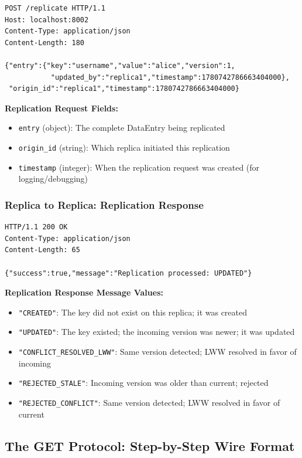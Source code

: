 \documentclass[10pt,a4paper]{article}
\begin{document}
\begin{verbatim}
POST /replicate HTTP/1.1
Host: localhost:8002
Content-Type: application/json
Content-Length: 180

{"entry":{"key":"username","value":"alice","version":1,
           "updated_by":"replica1","timestamp":1780742786663404000},
 "origin_id":"replica1","timestamp":1780742786663404000}
\end{verbatim}

\textbf{Replication Request Fields:}
\begin{itemize}
    \item \texttt{entry} (object): The complete DataEntry being replicated
    \item \texttt{origin\_id} (string): Which replica initiated this replication
    \item \texttt{timestamp} (integer): When the replication request was created (for logging/debugging)
\end{itemize}

\subsubsection{Replica to Replica: Replication Response}

\begin{verbatim}
HTTP/1.1 200 OK
Content-Type: application/json
Content-Length: 65

{"success":true,"message":"Replication processed: UPDATED"}
\end{verbatim}

\textbf{Replication Response Message Values:}
\begin{itemize}
    \item \texttt{"CREATED"}: The key did not exist on this replica; it was created
    \item \texttt{"UPDATED"}: The key existed; the incoming version was newer; it was updated
    \item \texttt{"CONFLICT\_RESOLVED\_LWW"}: Same version detected; LWW resolved in favor of incoming
    \item \texttt{"REJECTED\_STALE"}: Incoming version was older than current; rejected
    \item \texttt{"REJECTED\_CONFLICT"}: Same version detected; LWW resolved in favor of current
\end{itemize}

\subsection{The GET Protocol: Step-by-Step Wire Format}
\end{document}
